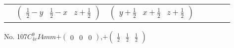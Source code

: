 \documentclass[fleqn,9pt,landscape]{jsarticle}
\begin{document}
\begin{center}
\begin{longtable}{ccccccc}
& $ \begin{pmatrix} \frac{1}{2} - y & \frac{1}{2} - x & z + \frac{1}{2} \end{pmatrix} $ & $ \begin{pmatrix} y + \frac{1}{2} & x + \frac{1}{2} & z + \frac{1}{2} \end{pmatrix} $ & $  $ & $  $ & $  $ & $  $ \\
\end{longtable}
\end{center}
\newpage
No. 107\quad$C_{4v}^{9}$\quad$I4mm$\quad[ tetragonal ]\quad$+\begin{pmatrix} 0 & 0 & 0 \end{pmatrix}$,\quad $+\begin{pmatrix} \frac{1}{2} & \frac{1}{2} & \frac{1}{2} \end{pmatrix}$
\end{document}
